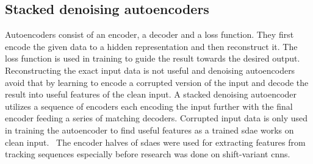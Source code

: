 \subsection{Stacked denoising autoencoders}
Autoencoders consist of an encoder, a decoder and a loss function. They first encode the
given data to a hidden representation and then reconstruct it. The loss function is
used in training to guide the result towards the desired output. Reconstructing the
exact input data is not useful and denoising autoencoders avoid that by learning to
encode a corrupted version of the input and decode the result into useful features of
the clean input. A stacked denoising autoencoder utilizes a sequence of encoders each
encoding the input further with the final encoder feeding a series of matching decoders.
Corrupted input data is only used in training the autoencoder to find useful features as
a trained \ac{sdae} works on clean input.~\cite{SDAE} The encoder halves of \ac{sdae}s
were used for extracting features from tracking sequences especially before research was
done on shift-variant \ac{cnn}s.
